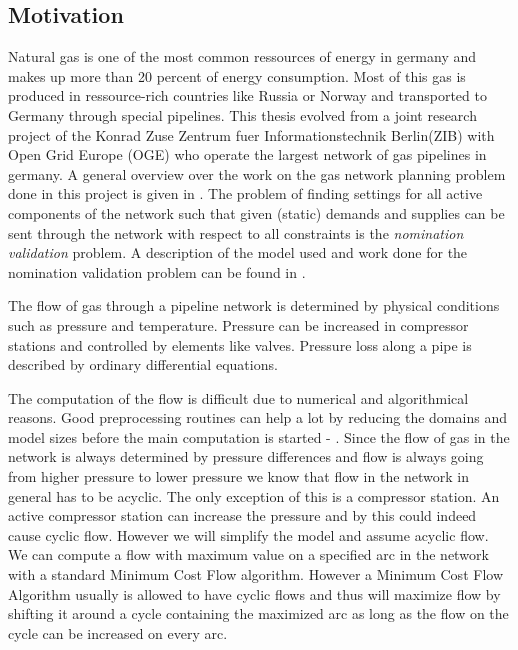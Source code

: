 \subsection{Motivation}
Natural gas is one of the most common ressources of energy in germany and makes up more than 20 percent of energy 
consumption. Most of this gas is produced in ressource-rich countries like Russia or Norway and transported to Germany 
through special pipelines. 
This thesis evolved from a joint research project of the Konrad Zuse Zentrum fuer Informationstechnik Berlin(ZIB) with 
Open Grid Europe (OGE) who operate the largest network of gas pipelines in germany. 
A general overview over the work on the gas network planning problem done in this project is given in 
\cite{FuegenschuhGeisslerGollmeretal.2013}. The problem of finding settings for all active components of the network 
such that given (static) demands and supplies can be sent through the network with respect to all constraints is the 
\textit{nomination validation} problem. A description of the model used and work done for the nomination validation 
problem can be found in \cite{PfetschFuegenschuhGeissleretal.2012}. 

The flow of gas through a pipeline network is determined by physical conditions such as pressure and temperature. 
Pressure can be increased in compressor stations and controlled by elements like valves. Pressure loss along a pipe is 
described by ordinary differential equations. 

The computation of the flow is difficult due to numerical and algorithmical reasons. Good preprocessing 
routines can help a lot by reducing the domains and model sizes before the main computation is started - .
Since the flow of gas in the network is always determined by pressure differences and flow is always going from higher 
pressure to lower pressure we know that flow in the network in general has to be acyclic. The only exception of this 
is a compressor station. An active compressor station can increase the pressure and by this could indeed cause cyclic 
flow. However we will simplify the model and assume acyclic flow. 
We can compute a flow with 
maximum value on a specified arc in the network with a standard Minimum Cost Flow algorithm. 
However a Minimum Cost Flow Algorithm usually is allowed to have cyclic flows and thus will maximize flow by shifting 
it around a cycle containing the maximized arc as long as the flow on the cycle can be increased on every arc. 

